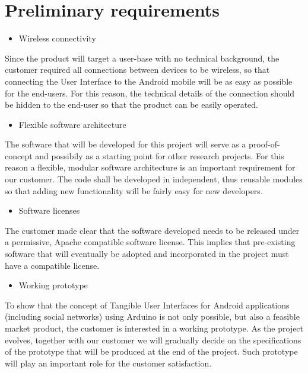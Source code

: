
\section{Preliminary requirements}
\begin{itemize}
\item Wireless connectivity
\end{itemize}
Since the product will target a user-base with no technical background,
the customer required all connections between devices to be wireless,
so that connecting the User Interface to the Android mobile will be
as easy as possible for the end-users. For this reason, the technical
details of the connection should be hidden to the end-user so that
the product can be easily operated.
\begin{itemize}
\item Flexible software architecture
\end{itemize}
The software that will be developed for this project will serve as
a proof-of-concept and possibily as a starting point for other research
projects. For this reason a flexible, modular software architecture
is an important requirement for our customer. The code shall be developed
in independent, thus reusable modules so that adding new functionality
will be fairly easy for new developers.
\begin{itemize}
\item Software licenses
\end{itemize}
The customer made clear that the software developed needs to be released
under a permissive, Apache compatible software license. This implies
that pre-existing software that will eventually be adopted and incorporated
in the project must have a compatible license.
\begin{itemize}
\item Working prototype
\end{itemize}
To show that the concept of Tangible User Interfaces for Android applications
(including social networks) using Arduino is not only possible, but
also a feasible market product, the customer is interested in a working
prototype. As the project evolves, together with our customer we will
gradually decide on the specifications of the prototype that will
be produced at the end of the project. Such prototype will play an
important role for the customer satisfaction.
